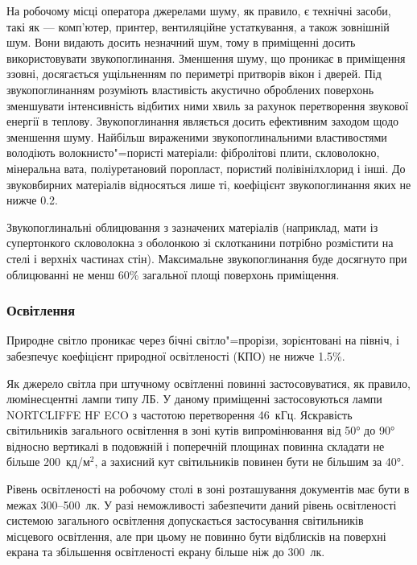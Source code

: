 \documentclass[simple,14pt,utf8,ukrainian]{eskdtext}
\begin{document}
      На робочому місці оператора джерелами шуму, як правило, є технічні
      засоби, такі як --- комп'ютер, принтер, вентиляційне устаткування, а
      також зовнішній шум.
      Вони видають досить незначний шум, тому в приміщенні досить
      використовувати звукопоглинання.
      Зменшення шуму, що проникає в приміщення ззовні, досягається ущільненням
      по периметрі притворів вікон і дверей.
      Під звукопоглинанням розуміють властивість акустично оброблених
      поверхонь зменшувати інтенсивність відбитих ними хвиль за рахунок
      перетворення звукової енергії в теплову.
      Звукопоглинання являється досить ефективним заходом щодо зменшення шуму.
      Найбільш вираженими звукопоглинальними властивостями володіють
      волокнисто"=пористі матеріали: фібролітові плити, скловолокно,
      мінеральна вата, поліуретановий поропласт, пористий полівінілхлорид і
      інші.
      До звуковбирних матеріалів відносяться лише ті, коефіцієнт
      звукопоглинання яких не нижче \num{0.2}.

      Звукопоглинальні облицювання з зазначених матеріалів (наприклад, мати із
      супертонкого скловолокна з оболонкою зі склотканини потрібно розмістити
      на стелі і верхніх частинах стін).
      Максимальне звукопоглинання буде досягнуто при облицюванні не менш
      \num{60}\% загальної площі поверхонь приміщення.
    \subsubsection{Освітлення}
      Природне світло проникає через бічні світло"=прорізи, зорієнтовані на
      північ, і забезпечує коефіцієнт природної освітленості (КПО) не нижче
      \num{1.5}\%.

      Як джерело світла при штучному освітленні повинні застосовуватися, як
      правило, люмінесцентні лампи типу ЛБ.
      У даному приміщенні застосовуються лампи NORTCLIFFE HF ECO з частотою
      перетворення \num{46}~кГц.
      Яскравість світильників загального освітлення в зоні кутів
      випромінювання від \ang{50} до \ang{90} відносно вертикалі в подовжній і
      поперечній площинах повинна складати не більше \num{200}~кд/м$^2$, а
      захисний кут світильників повинен бути не більшим за \ang{40}\cite{dbn}.

      Рівень освітленості на робочому столі в зоні розташування документів має
      бути в межах \num{300}--\num{500}~лк.
      У разі неможливості забезпечити даний рівень освітленості системою
      загального освітлення допускається застосування світильників місцевого
      освітлення, але при цьому не повинно бути відблисків на поверхні екрана
      та збільшення освітленості екрану більше ніж до \num{300}~лк.
\end{document}

